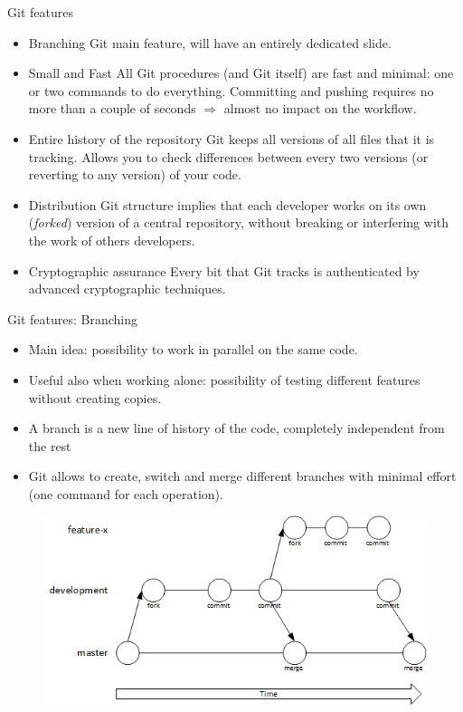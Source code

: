 \documentclass[aspectratio=169]{beamer}
\newcommand{\git}{Git{}}
\begin{document}
\begin{frame}{\git{} features}
    \begin{itemize}
    \justifying
        \item \alert{Branching} \git{} main feature, will have an entirely dedicated slide.
        \item \alert{Small and Fast} All \git{} procedures (and \git{} itself) are fast and minimal: one or two commands to do everything. Committing and pushing requires no more than a couple of seconds $\Rightarrow$ almost no impact on the workflow.
        \item \alert{Entire history of the repository} \git{} keeps all versions of all files that it is tracking. Allows you to check differences between every two versions (or reverting to any version) of your code.
        \item \alert{Distribution} \git{} structure implies that each developer works on its own (\emph{forked}) version of a central repository, without breaking or interfering with the work of others developers.
        \item \alert{Cryptographic assurance} Every bit that \git{} tracks is authenticated by advanced cryptographic techniques.
    \end{itemize}
\end{frame}

\begin{frame}{\git{} features: Branching}
    \begin{itemize}
    \justifying
        \item Main idea: possibility to \alert{work in parallel} on the same code. 
        \item Useful also when working alone: possibility of \alert{testing different features} without creating copies. 
        \item A \alert{branch} is a new line of history of the code, completely independent from the rest
        \item \git{} allows to \alert{create}, \alert{switch} and \alert{merge} different branches with minimal effort (one command for each operation).
    \end{itemize}

    \begin{figure}
        \centering
        \includegraphics[height=0.4\textheight]{git_workflow_1.png}
    \end{figure}
\end{frame}
\end{document}
